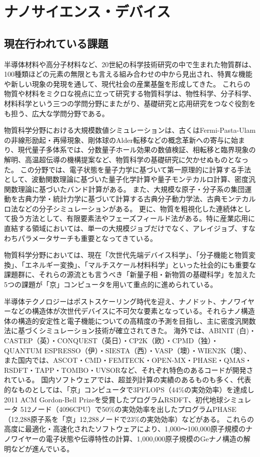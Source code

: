 \section{ナノサイエンス・デバイス}
\label{sec:ナノデバイス_詳細}

\subsection{現在行われている課題}
半導体材料や高分子材料など、20世紀の科学技術研究の中で生まれた物質群は、100種類ほどの元素の無限とも言える組み合わせの中から見出され、特異な機能や新しい現象の発現を通して、現代社会の産業基盤を形成してきた。
これらの物質や材料をミクロな視点に立って研究する物質科学は、物性科学、分子科学、材料科学という三つの学問分野にまたがり、基礎研究と応用研究をつなぐ役割をも担う、広大な学問分野である。

物質科学分野における大規模数値シミュレーションは、古くはFermi-Pasta-Ulamの非線形励起・再帰現象、剛体球のAlder転移などの概念革新への寄与に始まり、現代量子多体系では、分数量子ホール効果の数値検証、相転移と臨界現象の解明、高温超伝導の機構提案など、物質科学の基礎研究に欠かせぬものとなった。
この分野では、電子状態を量子力学に基づいて第一原理的に計算する手法として、波動関数理論に基づいた量子化学計算や量子モンテカルロ計算、密度汎関数理論に基づいたバンド計算がある。
また、大規模な原子・分子系の集団運動を古典力学・統計力学に基づいて計算する古典分子動力学法、古典モンテカルロ法などの分子シミュレーションがある。
更に、物質を粗視化した連続体として扱う方法として、有限要素法やフェーズフィールド法がある。特に産業応用に直結する領域においては、単一の大規模ジョブだけでなく、アレイジョブ、すなわちパラメータサーチも重要となってきている。

物質科学分野においては、現在「次世代先端デバイス科学」、「分子機能と物質変換」、「エネルギー変換」、「マルチスケール材料科学」といった社会的にも重要な課題群に、それらの源流とも言うべき「新量子相・新物質の基礎科学」を加えた5つの課題が「京」コンピュータを用いて重点的に進められている。

半導体テクノロジーはポストスケーリング時代を迎え、ナノドット、ナノワイヤーなどの構造体が次世代デバイスに不可欠な要素となっている。それらナノ構造体の構造的安定性と電子機能についての高精度の予測を目指し、主に密度汎関数法に基づくシミュレーション技術が確立されてきた。
海外では、ABINIT (白)・CASTEP（英）・CONQUEST（英日）・CP2K（欧）・CPMD（独）・QUANTUM ESPRESSO（伊）・SIESTA（西）・VASP（墺）・WIEN2K（墺）、また国内では、ASCOT・CMD・FEMTECK・OPEN-MX・PHASE・QMAS・RSDFT・TAPP・TOMBO・UVSORなど、それぞれ特色のあるコードが開発されている。
国内ソフトウェアでは、超並列計算の実績のあるものも多く、代表的なものとしては、「京」コンピュータで3PFLOPS（44\%の実効効率）を達成し2011 ACM Gordon-Bell Prizeを受賞したプログラムRSDFT、初代地球シミュレータ 512ノード（4096CPU）で50\%の実効効率を出したプログラムPHASE（12,288原子系を「京」12,288ノードで23\%の実効効率）などがある。
これらの高度に最適化・高速化されたソフトウェアにより、1,000〜100,000原子規模のナノワイヤーの電子状態や伝導特性の計算、1,000,000原子規模のGeナノ構造の解明などが進んでいる。

